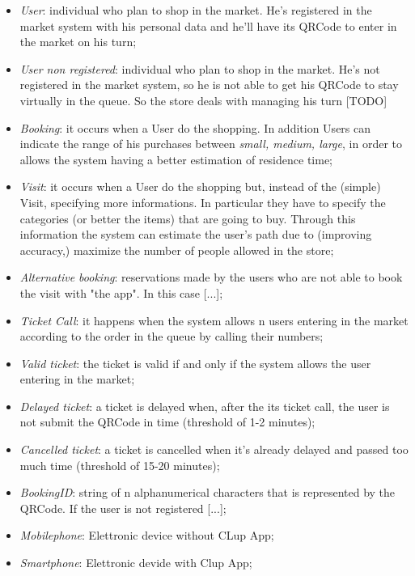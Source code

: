 \begin{itemize}
\item \textit{User}: individual who plan to shop in the market. He's registered in the market system with his personal data and he'll have its QRCode to enter in the market on his turn;
\item \textit{User non registered}: individual who plan to shop in the market. He's not registered in the market system, so he is not able to get his QRCode to stay virtually in the queue. So the store deals with managing his turn [TODO]
\item \textit{Booking}: it occurs when a User do the shopping. In addition Users can indicate the range of his purchases between  \textit{small, medium, large}, in order to allows the system having a better estimation of residence time;
\item \textit{Visit}: it occurs when a User do the shopping but, instead of the (simple) Visit, specifying more informations. In particular they have to specify the categories (or better the items) that are going to buy. Through this information the system can estimate the user's path due to (improving accuracy,) maximize the number of people allowed in the store;
\item \textit{Alternative booking}: reservations made by the users who are not able to book the visit with "the app". In this case [...];
\item \textit{Ticket Call}: it happens when the system allows n users entering in the market according to the order in the queue by calling their numbers;
\item \textit{Valid ticket}: the ticket is valid if and only if the system allows the user entering in the market;
\item \textit{Delayed ticket}: a ticket is delayed when, after the its ticket call, the user is not submit the QRCode in time (threshold of 1-2 minutes);
\item \textit{Cancelled ticket}: a ticket is cancelled when it's already delayed and passed too much time (threshold of 15-20 minutes);
\item \textit{BookingID}: string of n alphanumerical characters that is represented by the QRCode. If the user is not registered [...];
\item \textit{Mobilephone}: Elettronic device without CLup App;
\item \textit{Smartphone}: Elettronic devide with Clup App; 
\end{itemize}



